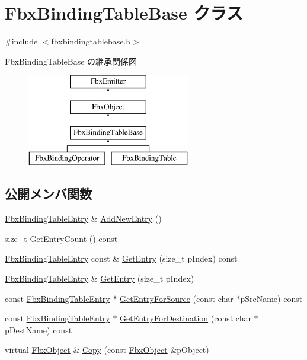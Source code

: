 \hypertarget{class_fbx_binding_table_base}{}\section{Fbx\+Binding\+Table\+Base クラス}
\label{class_fbx_binding_table_base}


{\ttfamily \#include $<$fbxbindingtablebase.\+h$>$}

Fbx\+Binding\+Table\+Base の継承関係図\begin{figure}[H]
\begin{center}
\leavevmode
\includegraphics[height=4.000000cm]{class_fbx_binding_table_base}
\end{center}
\end{figure}
\subsection*{公開メンバ関数}
\begin{DoxyCompactItemize}
\item 
\hyperlink{class_fbx_binding_table_entry}{Fbx\+Binding\+Table\+Entry} \& \hyperlink{class_fbx_binding_table_base_a2ebf180e80538abf0e6512a8ca30ee10}{Add\+New\+Entry} ()
\item 
size\+\_\+t \hyperlink{class_fbx_binding_table_base_a0a5379cd46e7e6dcf6f48bbd262034d8}{Get\+Entry\+Count} () const
\item 
\hyperlink{class_fbx_binding_table_entry}{Fbx\+Binding\+Table\+Entry} const  \& \hyperlink{class_fbx_binding_table_base_add6e787cc1decf0bfc57a2489cc96c1a}{Get\+Entry} (size\+\_\+t p\+Index) const
\item 
\hyperlink{class_fbx_binding_table_entry}{Fbx\+Binding\+Table\+Entry} \& \hyperlink{class_fbx_binding_table_base_a589d64fd21e06cb6206dfd290017b42a}{Get\+Entry} (size\+\_\+t p\+Index)
\item 
const \hyperlink{class_fbx_binding_table_entry}{Fbx\+Binding\+Table\+Entry} $\ast$ \hyperlink{class_fbx_binding_table_base_aa954d91bd7cf21ab56714414ca1e29f8}{Get\+Entry\+For\+Source} (const char $\ast$p\+Src\+Name) const
\item 
const \hyperlink{class_fbx_binding_table_entry}{Fbx\+Binding\+Table\+Entry} $\ast$ \hyperlink{class_fbx_binding_table_base_a458be38b5f0998c672d276989d278cb2}{Get\+Entry\+For\+Destination} (const char $\ast$p\+Dest\+Name) const
\item 
virtual \hyperlink{class_fbx_object}{Fbx\+Object} \& \hyperlink{class_fbx_binding_table_base_a9181d090913b604fd10a0a660a6e823b}{Copy} (const \hyperlink{class_fbx_object}{Fbx\+Object} \&p\+Object)
\end{DoxyCompactItemize}
